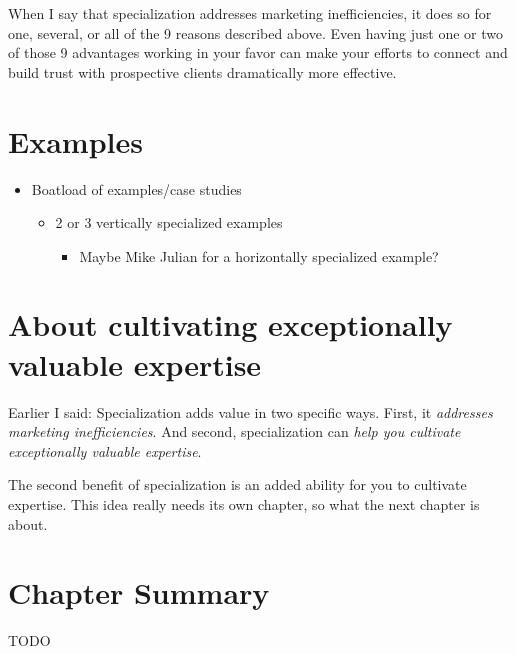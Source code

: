 When I say that specialization addresses marketing inefficiencies, it does so for one, several, or all of the 9 reasons described above. Even having just one or two of those 9 advantages working in your favor can make your efforts to connect and build trust with prospective clients dramatically more effective.

\section{Examples}

\begin{itemize}
\item Boatload of examples/case studies


\begin{itemize}
\item 2 or 3 vertically specialized examples


\begin{itemize}
\item Maybe Mike Julian for a horizontally specialized example?
\end{itemize}
\end{itemize}
\end{itemize}

\section{About cultivating exceptionally valuable expertise}

Earlier I said: Specialization adds value in two specific ways. First, it \emph{addresses marketing inefficiencies}. And second, specialization can \emph{help you cultivate exceptionally valuable expertise}.

The second benefit of specialization is an added ability for you to cultivate expertise. This idea really needs its own chapter, so what the next chapter is about.

\section{Chapter Summary}

TODO
